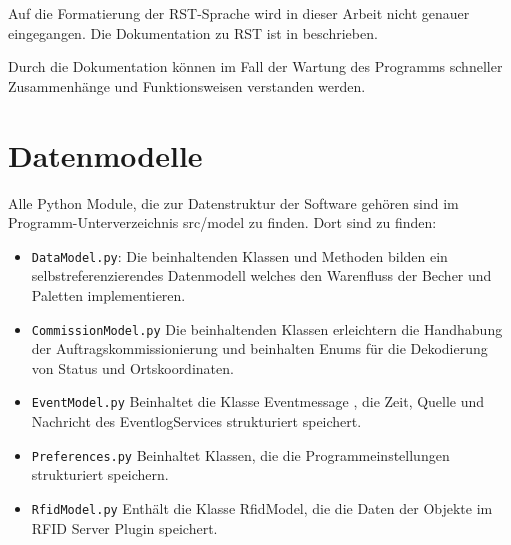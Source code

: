 Auf die Formatierung der RST-Sprache wird in dieser Arbeit nicht genauer eingegangen. Die Dokumentation zu RST ist in \cite{sphinxRST} beschrieben.

Durch die Dokumentation können im Fall der Wartung des Programms schneller Zusammenhänge und Funktionsweisen verstanden werden. 


\section{Datenmodelle}
Alle Python Module, die zur Datenstruktur der Software gehören sind im Programm-Unterverzeichnis \glqq src/model \grqq zu finden. 
Dort sind zu finden: 
\begin{itemize}
    \item \verb|DataModel.py|: Die beinhaltenden Klassen und Methoden bilden ein selbstreferenzierendes Datenmodell welches den \glq Warenfluss \grq der Becher und Paletten implementieren.
    \item \verb|CommissionModel.py| Die beinhaltenden Klassen erleichtern die Handhabung der Auftragskommissionierung und beinhalten Enums für die Dekodierung von Status und Ortskoordinaten. 
    \item \verb|EventModel.py| Beinhaltet die Klasse \glqq Eventmessage \grqq , die Zeit, Quelle und Nachricht des EventlogServices strukturiert speichert.
    \item \verb|Preferences.py| Beinhaltet Klassen, die die Programmeinstellungen strukturiert speichern. 
    \item \verb|RfidModel.py| Enthält die Klasse RfidModel, die die Daten der Objekte im RFID Server Plugin speichert.
\end{itemize}
